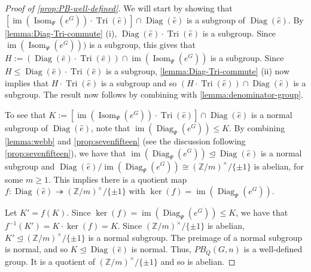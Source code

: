 \documentclass[11pt,a4paper,leqno]{amsart}
\theoremstyle{definition}
\theoremstyle{remark}
\newcommand{\wh}{\widehat}
\newcommand{\Z}{\mathbb{Z}}
\DeclareMathOperator{\IM}{im}
\DeclareMathOperator{\Isom}{Isom}
\DeclareMathOperator{\DiagIsom}{Diag}
\DeclareMathOperator{\TriIsom}{Tri}
\begin{document}
\begin{proof}[Proof of \cref{prop:PB-well-defined}]
We will start by showing that $[\IM(\Isom_\Psi(e^G)) \cdot \TriIsom(\wh e)] \cap \DiagIsom(\wh e)$ is a subgroup of $\DiagIsom(\wh e)$.
By \cref{lemma:Diag-Tri-commute} (i), $\DiagIsom(\wh e) \cdot \TriIsom(\wh e)$ is a subgroup. Since $\IM(\Isom_\Psi(e^G)))$ is a subgroup, this gives that $H := (\DiagIsom(\wh e) \cdot \TriIsom(\wh e)) \cap \IM(\Isom_\Psi(e^G))$ is a subgroup. Since $H \le \DiagIsom(\wh e) \cdot \TriIsom(\wh e)$ is a subgroup, \cref{lemma:Diag-Tri-commute} (ii) now implies that $H \cdot \TriIsom(\wh e)$ is a subgroup and so $(H \cdot \TriIsom(\wh e))\cap \DiagIsom(\wh e)$ is a subgroup.
The result now follows by combining with \cref{lemma:denominator-group}.

To see that $K:=[\IM(\Isom_\Psi(e^G)) \cdot \TriIsom(\wh e)] \cap \DiagIsom(\wh e)$ is a normal subgroup of $\DiagIsom(\wh e)$, note that $\IM(\DiagIsom_\Psi(e^G)) \le K$. By combining \cref{lemma:webb} and \cref{prop:sevenfifteen} (see the discussion following \cref{prop:sevenfifteen}), we have that $\IM(\DiagIsom_\Psi(e^G)) \unlhd \DiagIsom(\wh e)$ is a normal subgroup and $\DiagIsom(\wh e)/\IM(\DiagIsom_\Psi(e^G)) \cong (\Z/m)^\times/\{\pm 1\}$ is abelian, for some $m \ge 1$. This implies there is a quotient map $f \colon \DiagIsom(\wh e) \twoheadrightarrow (\Z/m)^\times/\{\pm 1\}$ with $\ker(f) = \IM(\DiagIsom_\Psi(e^G))$. 

Let $K' = f(K)$. Since $\ker(f) = \IM(\DiagIsom_\Psi(e^G)) \le K$, we have that $f^{-1}(K') = K \cdot \ker(f) =K$. Since $(\Z/m)^\times/\{\pm 1\}$ is abelian, $K' \unlhd (\Z/m)^\times/\{\pm 1\}$ is a normal subgroup. The preimage of a normal subgroup is normal, and so $K \unlhd \DiagIsom(\wh e)$ is normal.
Thus, $PB_Q(G,n)$ is a well-defined group. It is a quotient of $(\Z/m)^\times/\{\pm 1\}$ and so is abelian.
\end{proof}
\end{document}
